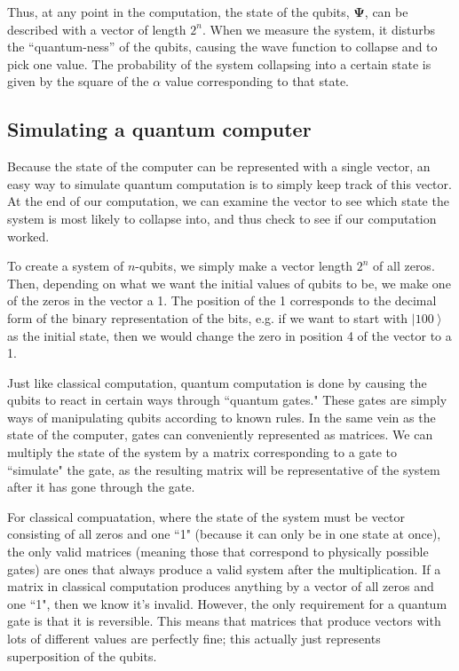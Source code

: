 \documentclass[11pt]{article}
\begin{document}
	Thus, at any point in the computation, the state of the qubits, $\mathbf{\Psi}$, can be described with a vector of length $2^{n}$. When we measure the system, it disturbs the “quantum-ness” of the qubits, causing the wave function to collapse and to pick one value. The probability of the system collapsing into a certain state is given by the square of the $\alpha$ value corresponding to that state.

\subsection{Simulating a quantum computer}

Because the state of the computer can be represented with a single vector, an easy way to simulate quantum computation is to simply keep track of this vector. At the end of our computation, we can examine the vector to see which state the system is most likely to collapse into, and thus check to see if our computation worked.

To create a system of $n$-qubits, we simply make a vector length $2^{n}$ of all zeros. Then, depending on what we want the initial values of qubits to be, we make one of the zeros in the vector a 1. The position of the 1 corresponds to the decimal form of the binary representation of the bits, e.g. if we want to start with $\left | 100 \right \rangle$ as the initial state, then we would change the zero in position 4 of the vector to a 1.

Just like classical computation, quantum computation is done by causing the qubits to react in certain ways through ``quantum gates." These gates are simply ways of manipulating qubits according to known rules. In the same vein as the state of the computer, gates can conveniently represented as matrices. We can multiply the state of the system by a matrix corresponding to a gate to ``simulate" the gate, as the resulting matrix will be representative of the system after it has gone through the gate.

For classical compuatation, where the state of the system must be vector consisting of all zeros and one ``1" (because it can only be in one state at once), the only valid matrices (meaning those that correspond to physically possible gates) are ones that always produce a valid system after the multiplication. If a matrix in classical computation produces anything by a vector of all zeros and one ``1", then we know it's invalid. However, the only requirement for a quantum gate is that it is reversible. This means that matrices that produce vectors with lots of different values are perfectly fine; this actually just represents superposition of the qubits.
\end{document}

